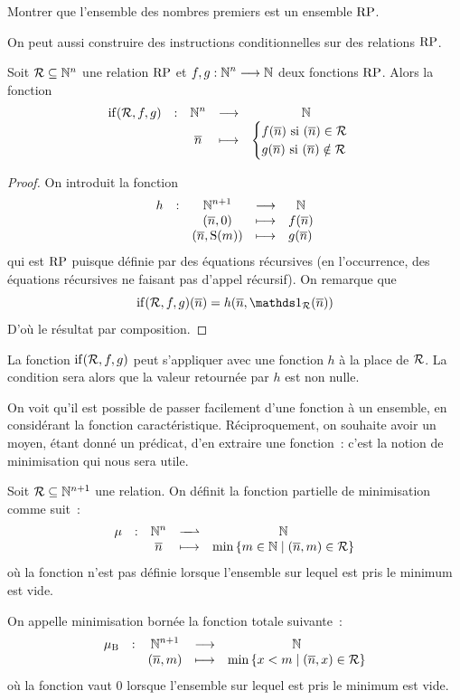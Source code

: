 \begin{exercise}
  Montrer que l'ensemble des nombres premiers est un ensemble $\operatorname{RP}$.
\end{exercise}

\noindent
On peut aussi construire des instructions conditionnelles sur des relations
$\operatorname{RP}$.

\begin{proposition}
  Soit $\mathord{\mathrel{\mathcal{R}}} \subseteq \mathbb N^n$ une relation $\operatorname{RP}$ et
  $f,g : \displaystyle \mathbb N^n \longrightarrow \mathbb N$ deux fonctions $\operatorname{RP}$. Alors la fonction
  \[\makeFun{\ifrm(\mathord{\varRR},f,g)}{\bN^n}{\bN}
            {\vec n}{\begin{cases}
                f(\vec n) \text{ si } (\vec n) \in \mathord{\varRR}\\
                g(\vec n) \text{ si } (\vec n) \notin \mathord{\varRR}
            \end{cases}}\]
\end{proposition}

\begin{proof}
  On introduit la fonction
  \[\makeFunBis{h}{\bN^{n+1}}{\bN}
               {(\vec n,0)}{f(\vec n)}
               {(\vec n,\Ss(m))}{g(\vec n)}\]
  qui est $\operatorname{RP}$ puisque définie par des équations récursives (en l'occurrence,
  des équations récursives ne faisant pas d'appel récursif). On remarque que
  \[\ifrm(\mathord{\varRR},f,g)(\vec n) =
  h(\vec n,\indicP{\mathord{\varRR}}(\vec n))\]
  D'où le résultat par composition.
\end{proof}

\begin{remark}
  La fonction $\operatorname{if}(\mathord{\mathrel{\mathcal{R}}},f,g)$ peut s'appliquer avec une fonction
  $h$ à la place de $\mathrel{\mathcal{R}}$. La condition sera alors que la valeur retournée
  par $h$ est non nulle.
\end{remark}

On voit qu'il est possible de passer facilement d'une fonction à un ensemble,
en considérant la fonction caractéristique. Réciproquement, on souhaite avoir
un moyen, étant donné un prédicat, d'en extraire une fonction~: c'est la notion
de minimisation qui nous sera utile.

\begin{definition}
  Soit $\mathord{\mathrel{\mathcal{R}}} \subseteq \mathbb N^{n+1}$ une relation. On définit la
  fonction partielle de minimisation comme suit~:
  \[\makeFunPartial{\muC}{\bN^n}{\bN}
                   {\vec n}
                   {\min\compr{m \in \bN}{(\vec n,m)\in\mathord{\varRR}}}\]
  où la fonction n'est pas définie lorsque l'ensemble sur lequel est pris le
  minimum est vide.

  On appelle minimisation bornée la fonction totale suivante~:
  \[\makeFun{\muB}{\bN^{n+1}}{\bN}
            {(\vec n,m)}{\min\compr{x < m}{(\vec n,x)\in\mathord{\varRR}}}\]
  où la fonction vaut $0$ lorsque l'ensemble sur lequel est pris le minimum est
  vide.
  \index[notation]{$\muC$}
  \index[notation]{$\muB$}
\end{definition}

